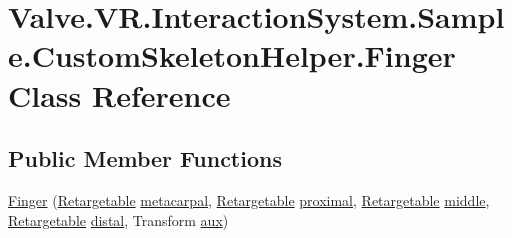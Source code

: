 \hypertarget{class_valve_1_1_v_r_1_1_interaction_system_1_1_sample_1_1_custom_skeleton_helper_1_1_finger}{}\section{Valve.\+V\+R.\+Interaction\+System.\+Sample.\+Custom\+Skeleton\+Helper.\+Finger Class Reference}
\label{class_valve_1_1_v_r_1_1_interaction_system_1_1_sample_1_1_custom_skeleton_helper_1_1_finger}
\subsection*{Public Member Functions}
\begin{DoxyCompactItemize}
\item 
\mbox{\hyperlink{class_valve_1_1_v_r_1_1_interaction_system_1_1_sample_1_1_custom_skeleton_helper_1_1_finger_a51ba48134fad73317d3857ccadea6dc1}{Finger}} (\mbox{\hyperlink{class_valve_1_1_v_r_1_1_interaction_system_1_1_sample_1_1_custom_skeleton_helper_1_1_retargetable}{Retargetable}} \mbox{\hyperlink{class_valve_1_1_v_r_1_1_interaction_system_1_1_sample_1_1_custom_skeleton_helper_1_1_finger_a3cde839b56f062f47cbcac5cc5e2d39a}{metacarpal}}, \mbox{\hyperlink{class_valve_1_1_v_r_1_1_interaction_system_1_1_sample_1_1_custom_skeleton_helper_1_1_retargetable}{Retargetable}} \mbox{\hyperlink{class_valve_1_1_v_r_1_1_interaction_system_1_1_sample_1_1_custom_skeleton_helper_1_1_finger_a2951dda098a33603116e361b6588cb19}{proximal}}, \mbox{\hyperlink{class_valve_1_1_v_r_1_1_interaction_system_1_1_sample_1_1_custom_skeleton_helper_1_1_retargetable}{Retargetable}} \mbox{\hyperlink{class_valve_1_1_v_r_1_1_interaction_system_1_1_sample_1_1_custom_skeleton_helper_1_1_finger_aa69e359ff2229e93cac8dc63a15a0c24}{middle}}, \mbox{\hyperlink{class_valve_1_1_v_r_1_1_interaction_system_1_1_sample_1_1_custom_skeleton_helper_1_1_retargetable}{Retargetable}} \mbox{\hyperlink{class_valve_1_1_v_r_1_1_interaction_system_1_1_sample_1_1_custom_skeleton_helper_1_1_finger_aaf811ae11e7b634c2ff8857abc779691}{distal}}, Transform \mbox{\hyperlink{class_valve_1_1_v_r_1_1_interaction_system_1_1_sample_1_1_custom_skeleton_helper_1_1_finger_a2bdd542921c2e05451277a00e0f8471e}{aux}})
\end{DoxyCompactItemize}
